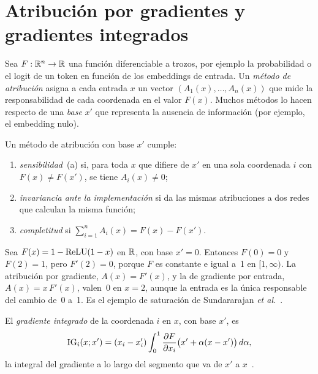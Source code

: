 \section{Atribución por gradientes y gradientes integrados}

Sea $F:\mathbb{R}^{n}\to\mathbb{R}$ una función diferenciable a trozos, por ejemplo la probabilidad o el logit de un token en función de los embeddings de entrada. Un \emph{método de atribución} asigna a cada entrada $x$ un vector $(A_1(x),\dots,A_n(x))$ que mide la responsabilidad de cada coordenada en el valor $F(x)$. Muchos métodos lo hacen respecto de una \emph{base} $x'$ que representa la ausencia de información (por ejemplo, el embedding nulo).

\begin{definicion}\label{def:axiomas}
Un método de atribución con base $x'$ cumple:
\begin{enumerate}
  \item \emph{sensibilidad}~(a) si, para toda $x$ que difiere de $x'$ en una sola coordenada $i$ con $F(x)\neq F(x')$, se tiene $A_i(x)\neq 0$;
  \item \emph{invariancia ante la implementación} si da las mismas atribuciones a dos redes que calculan la misma función;
  \item \emph{completitud} si $\sum_{i=1}^{n}A_i(x)=F(x)-F(x')$.
\end{enumerate}
\end{definicion}

\begin{ejemplo}\label{ej:saturacion}
Sea $F(x)=1-\operatorname{ReLU}(1-x)$ en $\mathbb{R}$, con base $x'=0$. Entonces $F(0)=0$ y $F(2)=1$, pero $F'(2)=0$, porque $F$ es constante e igual a~1 en $[1,\infty)$. La atribución por gradiente, $A(x)=F'(x)$, y la de gradiente por entrada, $A(x)=x\,F'(x)$, valen~0 en $x=2$, aunque la entrada es la única responsable del cambio de~0 a~1. Es el ejemplo de saturación de Sundararajan \emph{et al.}~\cite[§2.1]{sundararajan}.
\end{ejemplo}

\begin{definicion}\label{def:ig}
El \emph{gradiente integrado} de la coordenada $i$ en $x$, con base $x'$, es
\[
\operatorname{IG}_i(x;x')=(x_i-x'_i)\int_{0}^{1}\frac{\partial F}{\partial x_i}\bigl(x'+\alpha(x-x')\bigr)\,d\alpha,
\]
la integral del gradiente a lo largo del segmento que va de $x'$ a $x$~\cite[§3, ec.~(1)]{sundararajan}.
\end{definicion}


